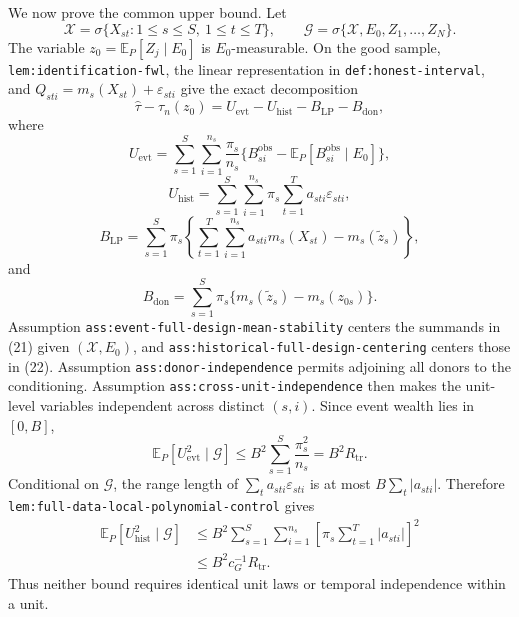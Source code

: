 We now prove the common upper bound.  Let
\[
\mathscr X=\sigma\{X_{st}:1\leq s\leq S,\ 1\leq t\leq T\},
\qquad
\mathscr G=\sigma\{\mathscr X,E_0,Z_1,\ldots,Z_N\}.
\]
The variable \(z_0=\mathbb E_P[Z_j\mid E_0]\) is \(E_0\)-measurable.  On the good sample, \texttt{lem:identification-fwl}, the linear representation in \texttt{def:honest-interval}, and \(Q_{sti}=m_s(X_{st})+\varepsilon_{sti}\) give the exact decomposition
\[
\widehat\tau-\tau_n(z_0)
=U_{\mathrm{evt}}-U_{\mathrm{hist}}-B_{\mathrm{LP}}-B_{\mathrm{don}},
\tag{20}
\]
where
\[
U_{\mathrm{evt}}
=\sum_{s=1}^{S}\sum_{i=1}^{n_s}\frac{\pi_s}{n_s}
\{B_{si}^{\mathrm{obs}}-\mathbb E_P[B_{si}^{\mathrm{obs}}\mid E_0]\},
\tag{21}
\]
\[
U_{\mathrm{hist}}
=\sum_{s=1}^{S}\sum_{i=1}^{n_s}\pi_s
\sum_{t=1}^{T}a_{sti}\varepsilon_{sti},
\tag{22}
\]
\[
B_{\mathrm{LP}}
=\sum_{s=1}^{S}\pi_s
\left\{\sum_{t=1}^{T}\sum_{i=1}^{n_s}a_{sti}m_s(X_{st})
-m_s(\widetilde z_s)\right\},
\tag{23}
\]
and
\[
B_{\mathrm{don}}
=\sum_{s=1}^{S}\pi_s\{m_s(\widetilde z_s)-m_s(z_{0s})\}.
\tag{24}
\]
Assumption \texttt{ass:event-full-design-mean-stability} centers the summands in (21) given \((\mathscr X,E_0)\), and \texttt{ass:historical-full-design-centering} centers those in (22).  Assumption \texttt{ass:donor-independence} permits adjoining all donors to the conditioning.  Assumption \texttt{ass:cross-unit-independence} then makes the unit-level variables independent across distinct \((s,i)\).  Since event wealth lies in \([0,B]\),
\[
\mathbb E_P[U_{\mathrm{evt}}^2\mid\mathscr G]
\leq B^2\sum_{s=1}^{S}\frac{\pi_s^2}{n_s}
=B^2R_{\mathrm{tr}}.
\tag{25}
\]
Conditional on \(\mathscr G\), the range length of
\(\sum_ta_{sti}\varepsilon_{sti}\) is at most
\(B\sum_t|a_{sti}|\).  Therefore \texttt{lem:full-data-local-polynomial-control} gives
\[
\begin{aligned}
\mathbb E_P[U_{\mathrm{hist}}^2\mid\mathscr G]
&\leq B^2\sum_{s=1}^{S}\sum_{i=1}^{n_s}
\left[\pi_s\sum_{t=1}^{T}|a_{sti}|\right]^2\\
&\leq B^2c_G^{-1}R_{\mathrm{tr}}.
\end{aligned}
\tag{26}
\]
Thus neither bound requires identical unit laws or temporal independence within a unit.


